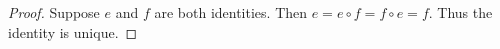 \begin{proof}
    Suppose $e$ and $f$ are both identities. Then $e=e\circ f=f\circ e=f.$ Thus the identity is unique.
\end{proof}